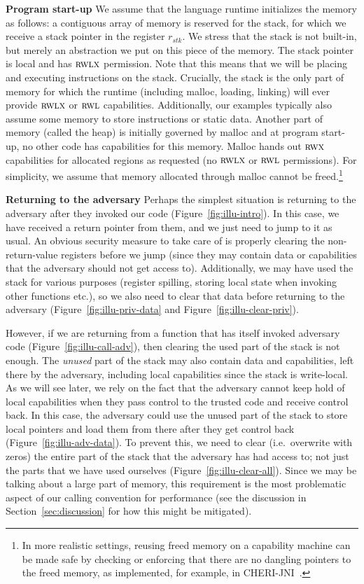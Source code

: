 \documentclass[format=acmsmall, review=true, screen=true]{acmart}
\renewcommand{\figurename}{Figure}
\renewcommand{\sectionname}{Section}
\newcommand{\var}[1]{\mathit{#1}}
\newcommand{\stk}{\var{stk}}
\newcommand{\plainperm}[1]{\textsc{#1}}
\newcommand{\rwx}{\plainperm{rwx}}
\newcommand{\readwritel}{\plainperm{rwl}}
\newcommand{\rwl}{\readwritel}
\newcommand{\rwlx}{\plainperm{rwlx}}
\newcommand{\itoplas}[1]{#1}
\begin{document}
\textbf{Program start-up} We assume that the language runtime initializes the
memory as follows: a contiguous array of memory is reserved for the stack, for
which we receive a stack pointer in the register $r_\stk$. We stress that
the stack is not built-in, but merely an abstraction we put on this piece of the
memory. The stack pointer is local and has $\rwlx$ permission. Note that this
means that we will be placing and executing instructions on the stack.
Crucially, the stack is the only part of memory for which the runtime (including
malloc, loading, linking) will ever provide $\rwlx$ or $\rwl$ capabilities.
Additionally, our examples typically also assume some memory to store
instructions or static data. Another part of memory (called the heap) is
initially governed by malloc and at program start-up, no other code has
capabilities for this memory. Malloc hands out $\rwx$ capabilities for allocated
regions as requested (no $\rwlx$ or $\rwl$ permissions). For simplicity, we
assume that memory allocated through malloc cannot be freed.\footnote{In more realistic settings, reusing freed memory on a capability machine can be made safe by checking or enforcing that there are no dangling pointers to the freed memory, as implemented, for example, in CHERI-JNI~\citep{chisnall_cheri_2017}. }

\textbf{Returning to the adversary} Perhaps the simplest situation is returning
to the adversary after they invoked our code \itoplas{(\figurename~\ref{fig:illu-intro})}. In this case, we have received a
return pointer from them, and we just need to jump to it as usual. An obvious
security measure to take care of is properly clearing the non-return-value
registers before we jump (since they may contain data or capabilities that the
adversary should not get access to). Additionally, we may have used the stack
for various purposes (register spilling, storing local state when invoking other
functions etc.), so we also need to clear that data before returning to the
adversary \itoplas{(\figurename~\ref{fig:illu-priv-data} and \figurename~\ref{fig:illu-clear-priv})}.

However, if we are returning from a function that has itself invoked adversary
code \itoplas{(\figurename~\ref{fig:illu-call-adv})}, then clearing the used part of the stack is not enough. The \emph{unused}
part of the stack may also contain data and capabilities, left there by the
adversary, including local capabilities since the stack is write-local. As we
will see later, we rely on the fact that the adversary cannot keep hold of local
capabilities when they pass control to the trusted code and receive control
back. In this case, the adversary could use the unused part of the stack to
store local pointers and load them from there after they get control back
\itoplas{(\figurename~\ref{fig:illu-adv-data})}. To
prevent this, we need to clear (i.e.\ overwrite with zeros) the entire part of
the stack that the adversary has had access to; not just the parts that we have
used ourselves \itoplas{(\figurename~\ref{fig:illu-clear-all})}. Since we may be talking about a large part of memory, this
requirement is the most problematic aspect of our calling convention for
performance (see the discussion in \sectionname~\ref{sec:discussion} for how this might be
mitigated).
\end{document}
